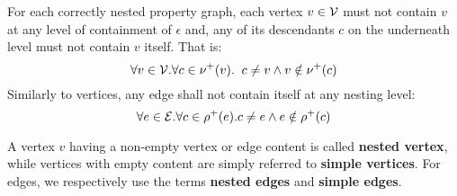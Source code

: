 \begin{axiom}
	For each correctly nested property graph, each vertex $v\in \mathcal{V}$ must not contain $v$ at any level of containment of $\epsilon$ and, any of its descendants $c$ on the underneath level must not contain $v$ itself. That is:
	\[\forall v\in \mathcal{V}. \forall c\in \nu^+(v).\;\; c\neq v\wedge v\notin \nu^+(c)\]
	Similarly to vertices, any edge shall not contain itself at any nesting level:
	\[\forall e\in \mathcal{E}. \forall c\in \rho^+(e). c\neq e\wedge e\notin \rho^+(c)\]
\end{axiom}

A vertex $v$ having a non-empty vertex or edge content is called \textbf{nested vertex}, while vertices with empty content are simply referred to \textbf{simple vertices}. For edges, we respectively use the terms \textbf{nested edges} and \textbf{simple edges}. 